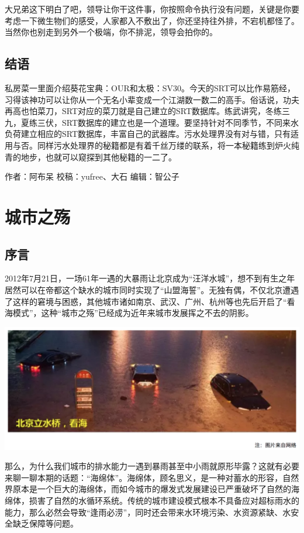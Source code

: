 \documentclass[]{book}
\begin{document}
大兄弟这下明白了吧，领导让你干这件事，你按照命令执行没有问题，关键是你要考虑一下微生物们的感受，人家都入不敷出了，你还坚持往外排，不宕机都怪了。当然你也别走到另外一个极端，你不排泥，领导会拍你的。

\subsection{结语}\label{-4}

私房菜一里面介绍葵花宝典：OUR和太极：SV30。今天的SRT可以比作易筋经，习得该神功可以让你从一个无名小辈变成一个江湖数一数二的高手。俗话说，功夫再高也怕菜刀，SRT对应的菜刀就是自己建立的SRT数据库。练武讲究，冬练三九，夏练三伏，SRT数据库的建立也是一个道理。要坚持针对不同季节，不同来水负荷建立相应的SRT数据库，丰富自己的武器库。污水处理界没有对与错，只有适用与否。同样污水处理界的秘籍都是有着千丝万缕的联系，将一本秘籍练到炉火纯青的地步，也就可以窥探到其他秘籍的一二了。

作者：阿布呆 校稿：yufree、大石 编辑：智公子

\section{城市之殇}

\subsection{序言}

2012年7月21日，一场61年一遇的大暴雨让北京成为``汪洋水城''，想不到有生之年居然可以在帝都这个缺水的城市同时实现了``山盟海誓''。无独有偶，不仅北京遭遇了这样的窘境与困惑，其他城市诸如南京、武汉、广州、杭州等也先后开启了``看海模式''，这种``城市之殇''已经成为近年来城市发展挥之不去的阴影。

\includegraphics[width=6.67in]{images/ch1}

那么，为什么我们城市的排水能力一遇到暴雨甚至中小雨就原形毕露？这就有必要来聊一聊本期的话题：``海绵体''。海绵体，顾名思义，是一种对蓄水的形容，自然界原本是一个巨大的海绵体，而如今城市的爆发式发展建设已严重破坏了自然的海绵体，损害了自然的水循环系统。传统的城市建设模式根本不具备应对超标雨水的能力，那么必然会导致``逢雨必涝''，同时还会带来水环境污染、水资源紧缺、水安全缺乏保障等问题。
\end{document}

